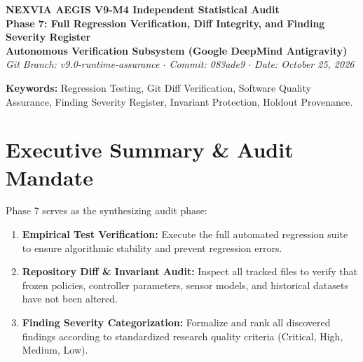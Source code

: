 \documentclass[10pt,a4paper]{article}
\begin{document}
\begin{center}
    {\LARGE \textbf{NEXVIA AEGIS V9-M4 Independent Statistical Audit}}\\[6pt]
    {\Large \textbf{Phase 7: Full Regression Verification, Diff Integrity, and Finding Severity Register}}\\[10pt]
    \textbf{Autonomous Verification Subsystem (Google DeepMind Antigravity)}\\
    \textit{Git Branch: v9.0-runtime-assurance \quad $\cdot$ \quad Commit: 083ade9 \quad $\cdot$ \quad Date: October 25, 2026}\\[12pt]
\end{center}

\begin{abstract}
\noindent This audit report details the comprehensive regression testing, source code diff audit, and integrated findings severity register for Milestone V9-M4 of the NEXVIA AEGIS runtime assurance architecture. We record empirical results from the focused 14-test synthetic preflight test suite and the complete 125-test repository regression suite (\texttt{PYTHONPATH=src uv run pytest -q}), confirming zero test failures across all components. We inspect the repository Git working tree to ensure that no modifications have compromised the frozen selected policy, controller dynamics, sensor models, calibration routines, or historical calibration/validation artifacts. Finally, we consolidate all audit findings into a formal, prioritized Finding Severity Register with concrete remediation specifications.
\end{abstract}

\vspace{6pt}
\noindent \textbf{Keywords:} Regression Testing, Git Diff Verification, Software Quality Assurance, Finding Severity Register, Invariant Protection, Holdout Provenance.

\section{Executive Summary \& Audit Mandate}
Phase 7 serves as the synthesizing audit phase:
\begin{enumerate}
    \item \textbf{Empirical Test Verification:} Execute the full automated regression suite to ensure algorithmic stability and prevent regression errors.
    \item \textbf{Repository Diff \& Invariant Audit:} Inspect all tracked files to verify that frozen policies, controller parameters, sensor models, and historical datasets have not been altered.
    \item \textbf{Finding Severity Categorization:} Formalize and rank all discovered findings according to standardized research quality criteria (Critical, High, Medium, Low).
\end{enumerate}
\end{document}
